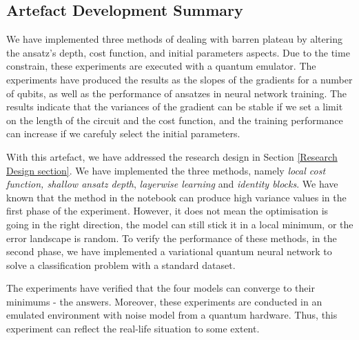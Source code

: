 \subsection{Artefact Development Summary}
We have implemented three methods of dealing with barren plateau by altering the ansatz's depth, cost function, and initial parameters aspects.
Due to the time constrain, these experiments are executed with a quantum emulator.
The experiments have produced the results as the slopes of the gradients for a number of qubits, as well as the performance of ansatzes in neural network training.
The results indicate that the variances of the gradient can be stable if we set a limit on the length of the circuit and the cost function, and the training performance can increase if we carefuly select the initial parameters.

With this artefact, we have addressed the research design in Section \ref{Research Design section}.
We have implemented the three methods, namely \textit{local cost function, shallow ansatz depth}, \textit{layerwise learning} and \textit{identity blocks}.
We have known that the method in the notebook can produce high variance values in the first phase of the experiment.
However, it does not mean the optimisation is going in the right direction, the model can still stick it in a local minimum, or the error landscape is random.
To verify the performance of these methods, in the second phase, we have implemented a variational quantum neural network to solve a classification problem with a standard dataset.

The experiments have verified that the four models can converge to their minimums - the answers.
Moreover, these experiments are conducted in an emulated environment with noise model from a quantum hardware.
Thus, this experiment can reflect the real-life situation to some extent.

